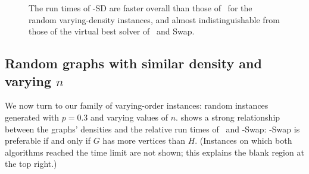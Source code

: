 \begin{figure}[h!]
    \centering
    \caption{The run times of \McSplit-SD are faster overall than those of \McSplit\ for the
        random varying-density instances, and almost indistinguishable from those of the virtual
        best solver of \McSplit\ and \McSplit\-Swap.}
        \label{figure:left-vs-smart-d-mcis}
\end{figure}

\subsection{Random graphs with similar density and varying $n$}

We now turn to our family of varying-order instances: random instances
generated with $p=0.3$ and varying values of $n$.
 shows a strong relationship between the graphs'
densities and the relative run times of \McSplit\ and \McSplit-Swap: 
\McSplit-Swap
is preferable if and only if $G$ has more vertices than $H$.  (Instances on which both
algorithms reached the time limit are not shown; this explains the blank region
at the top right.)


